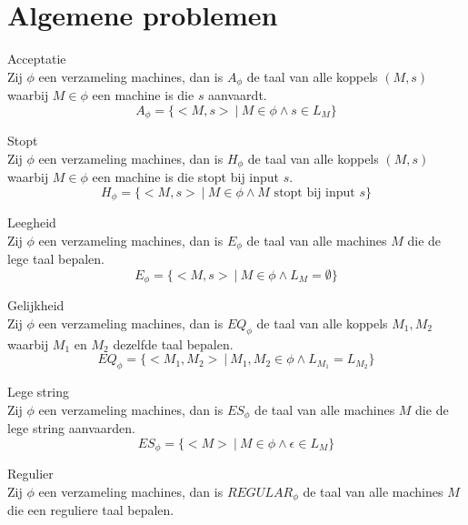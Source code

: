 \documentclass[main.tex]{subfiles}
\begin{document}
\section{Algemene problemen}
\label{sec:algemene-problemen}

\begin{de}
  Acceptatie\\
  Zij $\phi$ een verzameling machines, dan is $A_{\phi}$ de taal van alle koppels $(M,s)$ waarbij $M\in \phi$ een machine is die $s$ aanvaardt.
  \[ A_{\phi} = \{ <M,s> \ |\ M\in \phi \wedge s \in L_{M} \} \]
\end{de}

\begin{de}
  Stopt\\
  Zij $\phi$ een verzameling machines, dan is $H_{\phi}$ de taal van alle koppels $(M,s)$ waarbij $M\in \phi$ een machine is die stopt bij input $s$.
  \[ H_{\phi} = \{ <M,s> \ |\ M \in \phi \wedge M \text{ stopt bij input } s \} \]
\end{de}

\begin{de}
  Leegheid\\
  Zij $\phi$ een verzameling machines, dan is $E_{\phi}$ de taal van alle machines $M$ die de lege taal bepalen.
  \[ E_{\phi} = \{ <M,s>\ |\ M \in \phi \wedge L_{M} = \emptyset \} \]
\end{de}

\begin{de}
  Gelijkheid\\
  Zij $\phi$ een verzameling machines, dan is $EQ_{\phi}$ de taal van alle koppels $M_{1},M_{2}$ waarbij $M_{1}$ en $M_{2}$ dezelfde taal bepalen.
  \[ EQ_{\phi} = \{ <M_{1},M_{2}> \ |\ M_{1},M_{2} \in \phi \wedge L_{M_{1}} = L_{M_{2}} \} \]
\end{de}

\begin{de}
  Lege string\\
  Zij $\phi$ een verzameling machines, dan is $ES_{\phi}$ de taal van alle machines $M$ die de lege string aanvaarden.
  \[ ES_{\phi} = \{ <M> \ |\ M\in \phi \wedge \epsilon \in L_{M}\} \]
\end{de}

\begin{de}
  Regulier\\
  Zij $\phi$ een verzameling machines, dan is $REGULAR_{\phi}$ de taal van alle machines $M$ die een reguliere taal bepalen.
\end{de}
\end{document}
